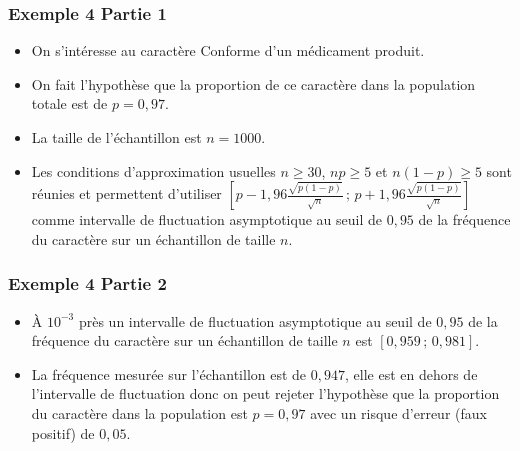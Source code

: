 \documentclass[xcolor=svgnames,t,final]{beamer}
\newcommand{\Interff}[2]{\left[#1\, ;\, #2\right]}
\begin{document}
\begin{frame}
\frametitle{Exemple 4 Partie 1}

\label{exemple4} 

\begin{itemize}
\pause \item On s'intéresse au caractère \og{} Conforme  \fg{}  d'un médicament produit.
\pause \item On fait l'hypothèse que la proportion de ce caractère dans la population totale est de $p=0,97$.
\pause \item La taille de l'échantillon est $n=1000$.
\pause \item Les conditions d'approximation usuelles $n \geqslant 30$, $np \geqslant 5$ et $n(1-p) \geqslant 5$ sont réunies et permettent d'utiliser $
\Interff{p-1,96\frac{\sqrt{p(1-p)}}{\sqrt{n}}}{p+1,96\frac{\sqrt{p(1-p)}}{\sqrt{n}}}$  comme intervalle de fluctuation asymptotique au seuil de $0,95$ de la fréquence  du caractère sur un échantillon de taille $n$.
\end{itemize}

\end{frame}



\begin{frame}
\frametitle{Exemple 4 Partie 2}



\begin{itemize}
\pause \item À $10^{-3}$ près un intervalle de fluctuation  asymptotique au seuil de $0,95$ de la fréquence  du caractère sur un échantillon de taille $n$ est $\Interff{0,959}{0,981}$.

\pause \item La fréquence mesurée sur l'échantillon est de $0,947$, elle est en dehors de l'intervalle de fluctuation donc on peut rejeter l'hypothèse que la proportion du caractère dans la population est $p=0,97$ avec un risque d'erreur (faux positif) de $0,05$.

\end{itemize}

\end{frame}
\end{document}
